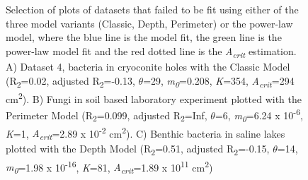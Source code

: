 \begin{figure}[htbp]
\caption{Selection of plots of datasets that failed to be fit using either of the three model variants (Classic, Depth, Perimeter) or the power-law model, where the blue line is the model fit, the green line is the power-law model fit and the red dotted line is the \textit{A\textsubscript{crit}} estimation. A) Dataset 4, bacteria in cryoconite holes with the Classic Model (R\textsubscript{2}=0.02, adjusted R\textsubscript{2}=-0.13, $\theta$=29, \textit{m\textsubscript{0}}=0.208, \textit{K}=354, \textit{A\textsubscript{crit}}=294 cm\textsuperscript{2}). B) Fungi in soil based laboratory experiment plotted with the Perimeter Model (R\textsubscript{2}=0.099, adjusted R\textsubscript{2}=Inf, $\theta$=6, \textit{m\textsubscript{0}}=6.24 x 10\textsuperscript{-6}, \textit{K}=1, \textit{A\textsubscript{crit}}=2.89 x 10\textsuperscript{-2} cm\textsuperscript{2}). C) Benthic bacteria in saline lakes plotted with the Depth Model (R\textsubscript{2}=0.51, adjusted R\textsubscript{2}=-0.15, $\theta$=14, \textit{m\textsubscript{0}}=1.98 x 10\textsuperscript{-16}, \textit{K}=81, \textit{A\textsubscript{crit}}=1.89 x 10\textsuperscript{11} cm\textsuperscript{2})}
\label{fig:myfig}
\end{figure}


